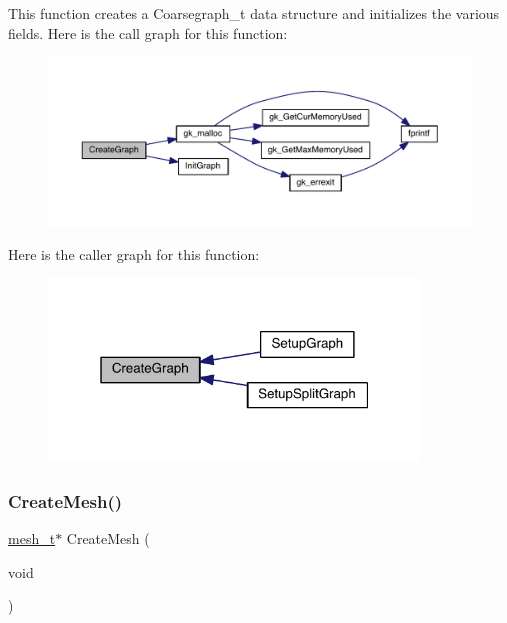 This function creates a Coarsegraph\+\_\+t data structure and initializes the various fields. Here is the call graph for this function\+:\nopagebreak
\begin{figure}[H]
\begin{center}
\leavevmode
\includegraphics[width=350pt]{a00951_a01903fa912de9fc7f01dace993a3fc85_cgraph}
\end{center}
\end{figure}
Here is the caller graph for this function\+:\nopagebreak
\begin{figure}[H]
\begin{center}
\leavevmode
\includegraphics[width=280pt]{a00951_a01903fa912de9fc7f01dace993a3fc85_icgraph}
\end{center}
\end{figure}
\mbox{\label{a00951_aec1a4bd83e832be7befbf6b03e9513ad}} 
\subsubsection{\texorpdfstring{Create\+Mesh()}{CreateMesh()}}
{\footnotesize\ttfamily \hyperlink{a00738}{mesh\+\_\+t}$\ast$ Create\+Mesh (\begin{DoxyParamCaption}\item[{void}]{ }\end{DoxyParamCaption})}

